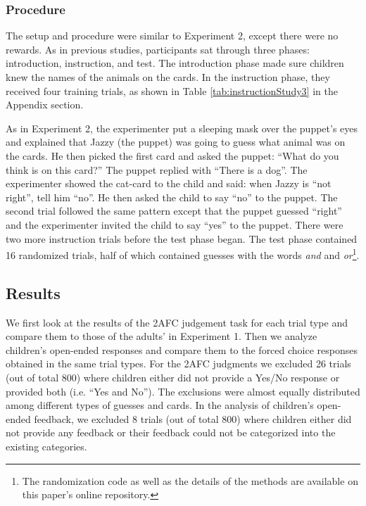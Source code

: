 \documentclass[,man,floatsintext]{apa6}
\let\rmarkdownfootnote\footnote%
\def\footnote{\protect\rmarkdownfootnote}
\begin{document}
\hypertarget{procedure-2}{%
\subsubsection{Procedure}\label{procedure-2}}

The setup and procedure were similar to Experiment 2, except there were no rewards. As in previous studies, participants sat through three phases: introduction, instruction, and test. The introduction phase made sure children knew the names of the animals on the cards. In the instruction phase, they received four training trials, as shown in Table \ref{tab:instructionStudy3} in the Appendix section.

As in Experiment 2, the experimenter put a sleeping mask over the puppet's eyes and explained that Jazzy (the puppet) was going to guess what animal was on the cards. He then picked the first card and asked the puppet: \enquote{What do you think is on this card?} The puppet replied with \enquote{There is a dog}. The experimenter showed the cat-card to the child and said: when Jazzy is \enquote{not right}, tell him \enquote{no}. He then asked the child to say \enquote{no} to the puppet. The second trial followed the same pattern except that the puppet guessed \enquote{right} and the experimenter invited the child to say \enquote{yes} to the puppet. There were two more instruction trials before the test phase began. The test phase contained 16 randomized trials, half of which contained guesses with the words \emph{and} and \emph{or}\footnote{The randomization code as well as the details of the methods are available on this paper's online repository.}.

\hypertarget{results-2}{%
\subsection{Results}\label{results-2}}

We first look at the results of the 2AFC judgement task for each trial type and compare them to those of the adults' in Experiment 1. Then we analyze children's open-ended responses and compare them to the forced choice responses obtained in the same trial types. For the 2AFC judgments we excluded 26 trials (out of total 800) where children either did not provide a Yes/No response or provided both (i.e. \enquote{Yes and No}). The exclusions were almost equally distributed among different types of guesses and cards. In the analysis of children's open-ended feedback, we excluded 8 trials (out of total 800) where children either did not provide any feedback or their feedback could not be categorized into the existing categories.
\end{document}
